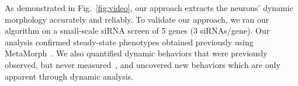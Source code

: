 As demonstrated in Fig.~\ref{fig:video}, our
approach extracts the neurons' dynamic morphology
accurately and reliably.  To validate our
approach, we ran our algorithm on a small-scale
siRNA screen of 5 genes (3 siRNAs/gene). Our
analysis confirmed steady-state phenotypes
obtained previously using
MetaMorph\texttrademark~\cite{Pertz08}. We also
quantified dynamic behaviors that were previously
observed, but never measured~\cite{Pertz08}, and
uncovered new behaviors which are only
apparent through dynamic analysis.







